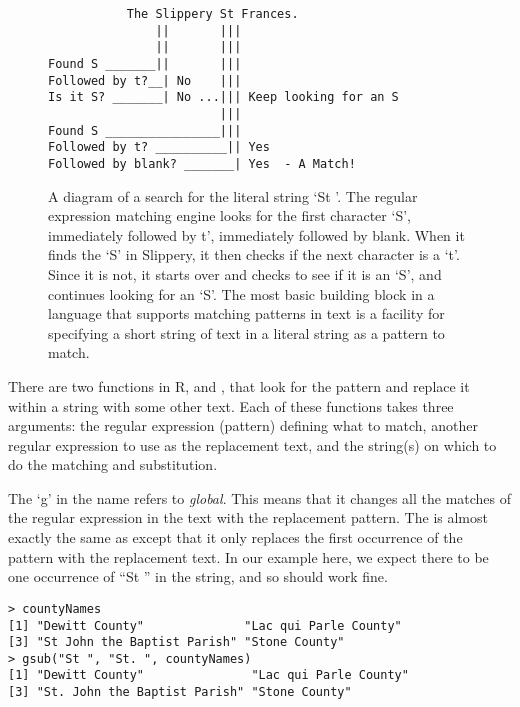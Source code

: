 \begin{figure}
{\footnotesize{
\begin{verbatim}
           The Slippery St Frances.
               ||       |||
               ||       |||
Found S _______||       |||
Followed by t?__| No    |||
Is it S? _______| No ...||| Keep looking for an S
                        |||
Found S ________________|||
Followed by t? __________|| Yes
Followed by blank? _______| Yes  - A Match!
\end{verbatim}
}}
\caption{A diagram of a search for the literal string `St '.  The
  regular expression matching engine looks for the first character
  `S', immediately followed by t', immediately followed by blank.
  When it finds the `S' in Slippery, it then checks if the next
  character is a `t'. Since it is not, it starts over and checks to
  see if it is an `S', and continues looking for an `S'.  The most
  basic building block in a language that supports matching patterns
  in text is a facility for specifying a short string of text in a
  literal string as a pattern to match.}\label{fig:literalString}
\end{figure}

There are two functions in R,  and ,
that look for the pattern and replace it within a string with some
other text.  Each of these functions takes three arguments: the
regular expression (pattern) defining what to match, another regular
expression to use as the replacement text, and the string(s) on which
to do the matching and substitution.

The `g' in the name  refers to \textit{global}.  This
means that it changes all the matches of the regular expression in the
text with the replacement pattern.  The  is almost
exactly the same as  except that it only replaces the
first occurrence of the pattern with the replacement text.  In our
example here, we expect there to be one occurrence of ``St '' in the
string, and so  should work fine.  {\footnotesize{
\begin{verbatim}
> countyNames
[1] "Dewitt County"              "Lac qui Parle County"      
[3] "St John the Baptist Parish" "Stone County"              
> gsub("St ", "St. ", countyNames)
[1] "Dewitt County"               "Lac qui Parle County"       
[3] "St. John the Baptist Parish" "Stone County"   
\end{verbatim}
}}

